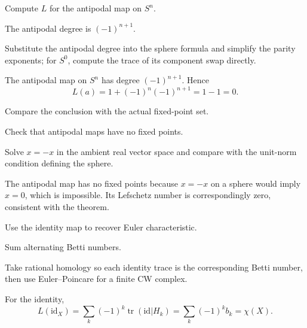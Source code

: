 \begin{exercise}\label{exr:viii35-18}
Compute $L$ for the antipodal map on $S^n$.
\end{exercise}
\begin{hint}
The antipodal degree is $(-1)^{n+1}$.

Substitute the antipodal degree into the sphere formula and simplify the parity exponents; for \(S^0\), compute the trace of its component swap directly.
\end{hint}
\begin{solution}
The antipodal map on \(S^n\) has degree \((-1)^{n+1}\). Hence
\[
L(a)=1+(-1)^n(-1)^{n+1}=1-1=0.
\]
\end{solution}

\begin{exercise}\label{exr:viii35-19}
Compare the conclusion with the actual fixed-point set.
\end{exercise}
\begin{hint}
Check that antipodal maps have no fixed points.

Solve \(x=-x\) in the ambient real vector space and compare with the unit-norm condition defining the sphere.
\end{hint}
\begin{solution}
The antipodal map has no fixed points because \(x=-x\) on a sphere would imply \(x=0\), which is impossible. Its Lefschetz number is correspondingly zero, consistent with the theorem.
\end{solution}

\begin{exercise}\label{exr:viii35-20}
Use the identity map to recover Euler characteristic.
\end{exercise}
\begin{hint}
Sum alternating Betti numbers.

Take rational homology so each identity trace is the corresponding Betti number, then use Euler--Poincare for a finite CW complex.
\end{hint}
\begin{solution}
For the identity,
\[
L(\mathrm{id}_X)=\sum_k(-1)^k\operatorname{tr}(\mathrm{id}|H_k)
=\sum_k(-1)^k b_k
=\chi(X).
\]
\end{solution}

